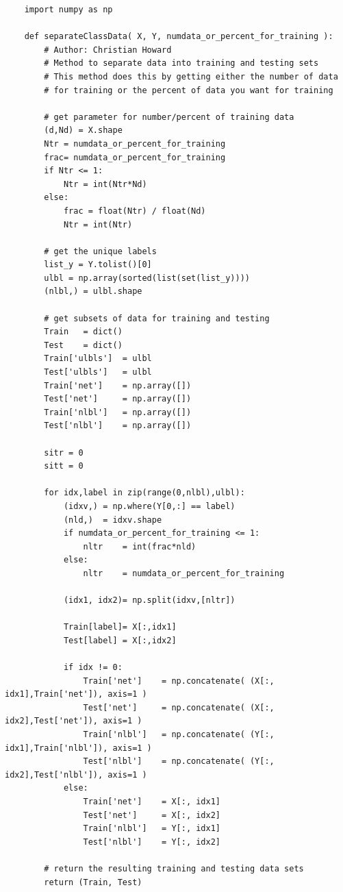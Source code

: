 \documentclass{article}[12pt]
\begin{document}
\begin{verbatim}
    import numpy as np

    def separateClassData( X, Y, numdata_or_percent_for_training ):
        # Author: Christian Howard
        # Method to separate data into training and testing sets
        # This method does this by getting either the number of data
        # for training or the percent of data you want for training

        # get parameter for number/percent of training data
        (d,Nd) = X.shape
        Ntr = numdata_or_percent_for_training
        frac= numdata_or_percent_for_training
        if Ntr <= 1:
            Ntr = int(Ntr*Nd)
        else:
            frac = float(Ntr) / float(Nd)
            Ntr = int(Ntr)

        # get the unique labels
        list_y = Y.tolist()[0]
        ulbl = np.array(sorted(list(set(list_y))))
        (nlbl,) = ulbl.shape

        # get subsets of data for training and testing
        Train   = dict()
        Test    = dict()
        Train['ulbls']  = ulbl
        Test['ulbls']   = ulbl
        Train['net']    = np.array([])
        Test['net']     = np.array([])
        Train['nlbl']   = np.array([])
        Test['nlbl']    = np.array([])

        sitr = 0
        sitt = 0

        for idx,label in zip(range(0,nlbl),ulbl):
            (idxv,) = np.where(Y[0,:] == label)
            (nld,)  = idxv.shape
            if numdata_or_percent_for_training <= 1:
                nltr    = int(frac*nld)
            else:
                nltr    = numdata_or_percent_for_training

            (idx1, idx2)= np.split(idxv,[nltr])

            Train[label]= X[:,idx1]
            Test[label] = X[:,idx2]

            if idx != 0:
                Train['net']    = np.concatenate( (X[:, idx1],Train['net']), axis=1 )
                Test['net']     = np.concatenate( (X[:, idx2],Test['net']), axis=1 )
                Train['nlbl']   = np.concatenate( (Y[:, idx1],Train['nlbl']), axis=1 )
                Test['nlbl']    = np.concatenate( (Y[:, idx2],Test['nlbl']), axis=1 )
            else:
                Train['net']    = X[:, idx1]
                Test['net']     = X[:, idx2]
                Train['nlbl']   = Y[:, idx1]
                Test['nlbl']    = Y[:, idx2]

        # return the resulting training and testing data sets
        return (Train, Test)
\end{verbatim}
   
\end{document}

